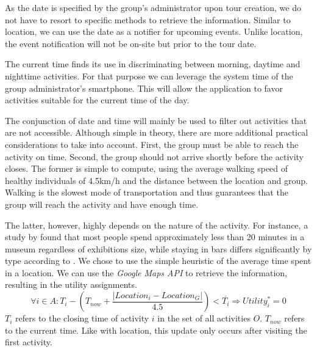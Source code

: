 \documentclass[11pt,a4paper,oneside]{article}
\begin{document}
As the date is specified by the group's administrator upon tour creation, we do not have to resort to specific methods to retrieve the information. Similar to location, we can use the date as a notifier for upcoming events. Unlike location, the event notification will not be on-site but prior to the tour date.

The current time finds its use in discriminating between morning, daytime and nighttime activities. For that purpose we can leverage the system time of the group administrator's smartphone. This will allow the application to favor activities suitable for the current time of the day.

The conjunction of date and time will mainly be used to filter out activities that are not accessible. Although simple in theory, there are more additional practical considerations to take into account. First, the group must be able to reach the activity on time. Second, the group should not arrive shortly before the activity closes. The former is simple to compute, using the average walking speed of healthy individuals of 4.5km/h and the distance between the location and group. Walking is the slowest mode of transportation and thus guarantees that the group will reach the activity and have enough time. 

The latter, however, highly depends on the nature of the activity. For instance, a study by \citeauthor{serrell_PayingAttentionDuration_1997} found that most people spend approximately less than 20 minutes in a museum regardless of exhibitions size, while staying in bars differs significantly by type according to \citeauthor{harford_DrinkingBarsObservational_1983}.\cite{serrell_PayingAttentionDuration_1997}\cite{harford_DrinkingBarsObservational_1983} We chose to use the simple heuristic of the average time spent in a location. We can use the \emph{Google Maps API} to retrieve the information, resulting in the utility assignments. 
\begin{equation}
    \forall i \in A: T_i - (T_{now} + \frac{\lvert Location_i - Location_G \rvert}{4.5}) < \overline{T_i} \Rightarrow Utility_{i}^* = 0
\end{equation}
$T_i$ refers to the closing time of activity $i$ in the set of all activities $O$. $T_{now}$ refers to the current time. Like with location, this update only occurs after visiting the first activity. 
\end{document}
